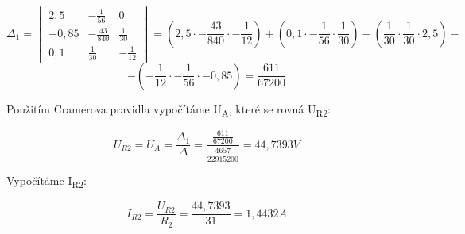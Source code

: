 \[ \Delta_{1} = \begin{vmatrix} 
2,5 & -\frac{1}{56} & 0\\
-0,85 & -\frac{43}{840} & \frac{1}{30}\\
0,1 & \frac{1}{30} & -\frac{1}{12}
\end{vmatrix} =
\left(2,5 \cdot -\frac{43}{840} \cdot -\frac{1}{12}\right) + \left( 0,1 \cdot -\frac{1}{56} \cdot \frac{1}{30} \right) - \left(\frac{1}{30} \cdot \frac{1}{30} \cdot 2,5\right) - \]
\[ -\left(-\frac{1}{12} \cdot -\frac{1}{56} \cdot -0,85\right) = \frac{611}{67200}
\]

Použitím Cramerova pravidla vypočítáme U\textsubscript{A}, které se rovná U\textsubscript{R2}:

\[ U_{R2} = U_{A} = \frac{\Delta_{1}}{\Delta} = \frac{\frac{611}{67200}}{\frac{4657}{22915200}} = 44,7393V \]

Vypočítáme I\textsubscript{R2}:

\[ I_{R2} = \frac{U_{R2}}{R_{2}} = \frac{44,7393}{31} = 1,4432A\]